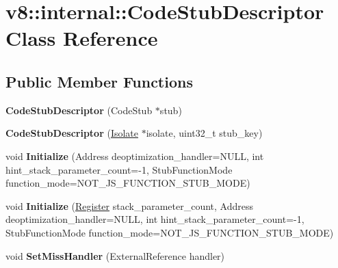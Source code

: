 \hypertarget{classv8_1_1internal_1_1_code_stub_descriptor}{}\section{v8\+:\+:internal\+:\+:Code\+Stub\+Descriptor Class Reference}
\label{classv8_1_1internal_1_1_code_stub_descriptor}
\subsection*{Public Member Functions}
\begin{DoxyCompactItemize}
\item 
{\bfseries Code\+Stub\+Descriptor} (Code\+Stub $\ast$stub)\hypertarget{classv8_1_1internal_1_1_code_stub_descriptor_a2daf19518c230bf6ca4b4434a931800d}{}\label{classv8_1_1internal_1_1_code_stub_descriptor_a2daf19518c230bf6ca4b4434a931800d}

\item 
{\bfseries Code\+Stub\+Descriptor} (\hyperlink{classv8_1_1internal_1_1_isolate}{Isolate} $\ast$isolate, uint32\+\_\+t stub\+\_\+key)\hypertarget{classv8_1_1internal_1_1_code_stub_descriptor_af07f54357f40df027679c9596651d586}{}\label{classv8_1_1internal_1_1_code_stub_descriptor_af07f54357f40df027679c9596651d586}

\item 
void {\bfseries Initialize} (Address deoptimization\+\_\+handler=N\+U\+LL, int hint\+\_\+stack\+\_\+parameter\+\_\+count=-\/1, Stub\+Function\+Mode function\+\_\+mode=N\+O\+T\+\_\+\+J\+S\+\_\+\+F\+U\+N\+C\+T\+I\+O\+N\+\_\+\+S\+T\+U\+B\+\_\+\+M\+O\+DE)\hypertarget{classv8_1_1internal_1_1_code_stub_descriptor_a814923e13b891b6f7ab5bfedd9b3b664}{}\label{classv8_1_1internal_1_1_code_stub_descriptor_a814923e13b891b6f7ab5bfedd9b3b664}

\item 
void {\bfseries Initialize} (\hyperlink{structv8_1_1internal_1_1_register}{Register} stack\+\_\+parameter\+\_\+count, Address deoptimization\+\_\+handler=N\+U\+LL, int hint\+\_\+stack\+\_\+parameter\+\_\+count=-\/1, Stub\+Function\+Mode function\+\_\+mode=N\+O\+T\+\_\+\+J\+S\+\_\+\+F\+U\+N\+C\+T\+I\+O\+N\+\_\+\+S\+T\+U\+B\+\_\+\+M\+O\+DE)\hypertarget{classv8_1_1internal_1_1_code_stub_descriptor_a12a3c1cb8b11b181d840c2853e5a174a}{}\label{classv8_1_1internal_1_1_code_stub_descriptor_a12a3c1cb8b11b181d840c2853e5a174a}

\item 
void {\bfseries Set\+Miss\+Handler} (External\+Reference handler)\hypertarget{classv8_1_1internal_1_1_code_stub_descriptor_a5c0699ab7cbd35d63f7bb4e25f5a4778}{}\label{classv8_1_1internal_1_1_code_stub_descriptor_a5c0699ab7cbd35d63f7bb4e25f5a4778}


\end{DoxyCompactItemize}

